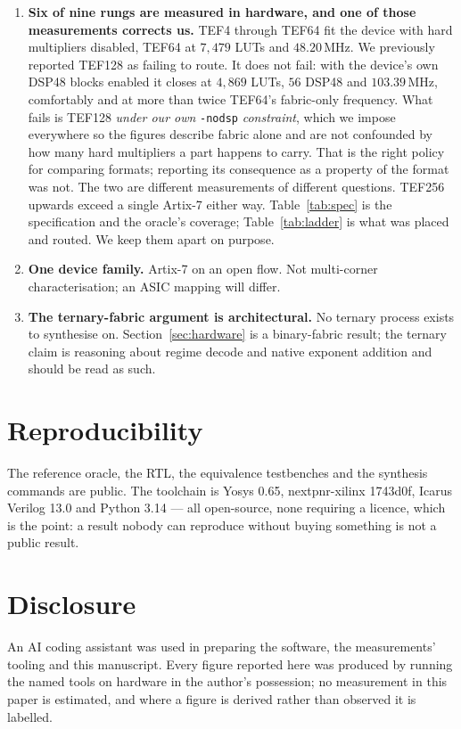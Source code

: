 \documentclass[11pt]{article}
\theoremstyle{definition}
\begin{document}
\begin{enumerate}[leftmargin=*]
\item \textbf{Six of nine rungs are measured in hardware, and one of those
measurements corrects us.} TEF4 through TEF64 fit the device with hard multipliers
disabled, TEF64 at $7{,}479$ LUTs and $48.20$\,MHz. We previously reported TEF128
as failing to route. It does not fail: with the device's own DSP48 blocks enabled
it closes at $4{,}869$ LUTs, $56$ DSP48 and $103.39$\,MHz, comfortably and at more
than twice TEF64's fabric-only frequency. What fails is TEF128 \emph{under our own}
\texttt{-nodsp} \emph{constraint}, which we impose everywhere so the figures
describe fabric alone and are not confounded by how many hard multipliers a part
happens to carry. That is the right policy for comparing formats; reporting its
consequence as a property of the format was not. The two are different
measurements of different questions. TEF256 upwards exceed a single Artix-7
either way. Table~\ref{tab:spec} is the
specification and the oracle's coverage; Table~\ref{tab:ladder} is what was
placed and routed. We keep them apart on purpose.

\item \textbf{One device family.} Artix-7 on an open flow. Not multi-corner
characterisation; an ASIC mapping will differ.

\item \textbf{The ternary-fabric argument is architectural.} No ternary process
exists to synthesise on. Section~\ref{sec:hardware} is a binary-fabric result;
the ternary claim is reasoning about regime decode and native exponent addition
and should be read as such.
\end{enumerate}

\section*{Reproducibility}

The reference oracle, the RTL, the equivalence testbenches and the synthesis
commands are public. The toolchain is Yosys 0.65, nextpnr-xilinx 1743d0f,
Icarus Verilog 13.0 and Python 3.14 --- all open-source, none requiring a
licence, which is the point: a result nobody can reproduce without buying
something is not a public result.

\section*{Disclosure}

An AI coding assistant was used in preparing the software, the measurements'
tooling and this manuscript. Every figure reported here was produced by running
the named tools on hardware in the author's possession; no measurement in this
paper is estimated, and where a figure is derived rather than observed it is
labelled.
\end{document}
